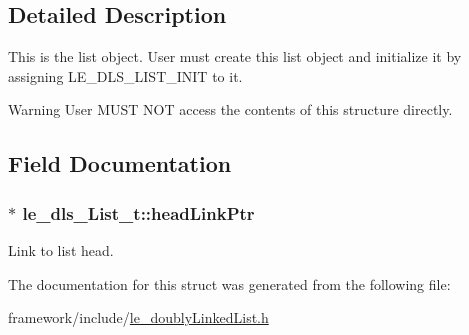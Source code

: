 \subsection{Detailed Description}
This is the list object. User must create this list object and initialize it by assigning L\+E\+\_\+\+D\+L\+S\+\_\+\+L\+I\+S\+T\+\_\+\+I\+N\+IT to it.

\begin{DoxyWarning}{Warning}
User M\+U\+ST N\+OT access the contents of this structure directly. 
\end{DoxyWarning}


\subsection{Field Documentation}
\subsubsection[{\texorpdfstring{head\+Link\+Ptr}{headLinkPtr}}]{$\ast$ le\+\_\+dls\+\_\+\+List\+\_\+t\+::head\+Link\+Ptr}\hypertarget{structle__dls___list__t_a830f3082336d0b79e10e6206e2428dda}{}\label{structle__dls___list__t_a830f3082336d0b79e10e6206e2428dda}


Link to list head. 



The documentation for this struct was generated from the following file\+:\begin{DoxyCompactItemize}
\item 
framework/include/\hyperlink{le__doubly_linked_list_8h}{le\+\_\+doubly\+Linked\+List.\+h}\end{DoxyCompactItemize}
